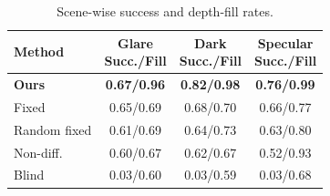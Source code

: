 \begin{table}[t]
\centering
\footnotesize
\renewcommand{\arraystretch}{1.12}
\setlength{\tabcolsep}{9pt}
\begin{tabular}{@{}lccc@{}}
\toprule
Method & \shortstack{Glare\\Succ./Fill} & \shortstack{Dark\\Succ./Fill} & \shortstack{Specular\\Succ./Fill} \\
\midrule
\textbf{Ours} & \textbf{0.67/0.96} & \textbf{0.82/0.98} & \textbf{0.76/0.99} \\
Fixed & 0.65/0.69 & 0.68/0.70 & 0.66/0.77 \\
Random fixed & 0.61/0.69 & 0.64/0.73 & 0.63/0.80 \\
Non-diff. & 0.60/0.67 & 0.62/0.67 & 0.52/0.93 \\
Blind & 0.03/0.60 & 0.03/0.59 & 0.03/0.68 \\
\bottomrule
\end{tabular}
\caption{Scene-wise success and depth-fill rates.}
\label{tab:journal_scene_breakdown}
\end{table}

